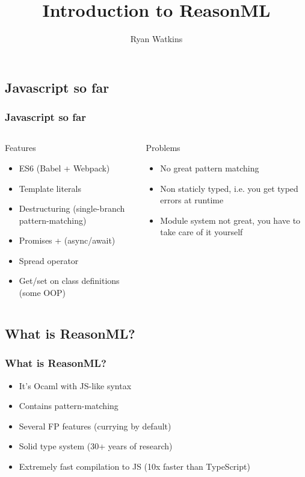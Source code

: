 \documentclass{beamer}
\author{Ryan Watkins}
\title{Introduction to ReasonML}
\begin{document}
\begin{frame}
  \titlepage
\end{frame}

\begin{frame}
  \section{Javascript so far}
  \frametitle{Javascript so far}
  \pause
  \begin{columns}
    \begin{block}{Features}
      \begin{itemize}
      \item ES6 (Babel + Webpack)
        \pause
      \item Template literals
        \pause
      \item Destructuring (single-branch pattern-matching)
        \pause
      \item Promises + (async/await)
        \pause
      \item Spread operator
        \pause
      \item Get/set on class definitions (some OOP)
      \end{itemize}
    \end{block}
    \begin{block}{Problems}
      \begin{itemize}
      \item No great pattern matching
        \pause
      \item Non staticly typed, i.e. you get typed errors at runtime
        \pause
      \item Module system not great, you have to take care of it yourself
      \end{itemize}
    \end{block}
  \end{columns}
\end{frame}

\begin{frame}
  \section{What is ReasonML?}
  \frametitle{What is ReasonML?}
  \pause
  \begin{itemize}
  \item It's Ocaml with JS-like syntax
    \pause
  \item Contains pattern-matching
    \pause
  \item Several FP features (currying by default)
    \pause
  \item Solid type system (30+ years of research)
    \pause
  \item Extremely fast compilation to JS (10x faster than TypeScript)
  \end{itemize}
\end{frame}
\end{document}
